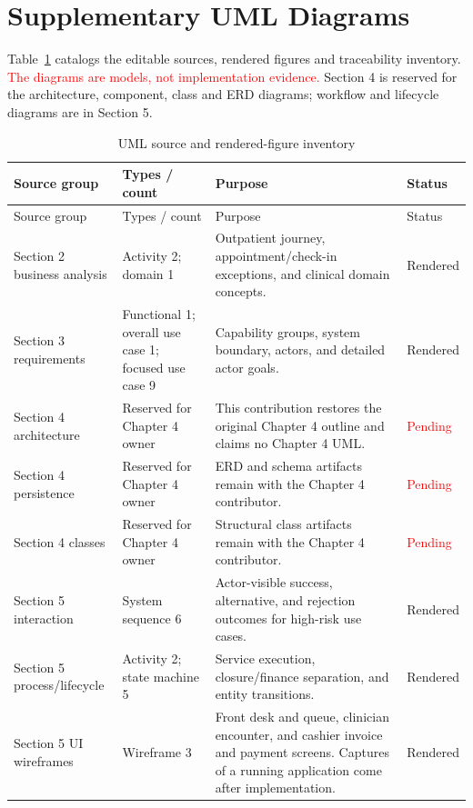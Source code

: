 \documentclass[a4paper,12pt]{article}
\newcommand{\weak}[1]{\textcolor{red}{#1}}
\begin{document}
\section{Supplementary UML Diagrams}
Table~\ref{tab:uml-artifact-inventory} catalogs the editable sources, rendered figures and traceability inventory. \weak{The diagrams are models, not implementation evidence.} Section 4 is reserved for the architecture, component, class and ERD diagrams; workflow and lifecycle diagrams are in Section 5.

\begin{longtable}{@{}p{}p{}p{}p{}@{}}
\caption{UML source and rendered-figure inventory}\label{tab:uml-artifact-inventory}\\
\toprule Source group & Types / count & Purpose & Status \\
\midrule
\endfirsthead
\toprule Source group & Types / count & Purpose & Status \\
\midrule
\endhead
Section 2 business analysis & Activity 2; domain 1 & Outpatient journey, appointment/check-in exceptions, and clinical domain concepts. & Rendered \\
Section 3 requirements & Functional 1; overall use case 1; focused use case 9 & Capability groups, system boundary, actors, and detailed actor goals. & Rendered \\
Section 4 architecture & Reserved for Chapter 4 owner & This contribution restores the original Chapter 4 outline and claims no Chapter 4 UML. & \weak{Pending} \\
Section 4 persistence & Reserved for Chapter 4 owner & ERD and schema artifacts remain with the Chapter 4 contributor. & \weak{Pending} \\
Section 4 classes & Reserved for Chapter 4 owner & Structural class artifacts remain with the Chapter 4 contributor. & \weak{Pending} \\
Section 5 interaction & System sequence 6 & Actor-visible success, alternative, and rejection outcomes for high-risk use cases. & Rendered \\
Section 5 process/lifecycle & Activity 2; state machine 5 & Service execution, closure/finance separation, and entity transitions. & Rendered \\
Section 5 UI wireframes & Wireframe 3 & Front desk and queue, clinician encounter, and cashier invoice and payment screens. Captures of a running application come after implementation. & Rendered \\
\bottomrule
\end{longtable}
\end{document}
